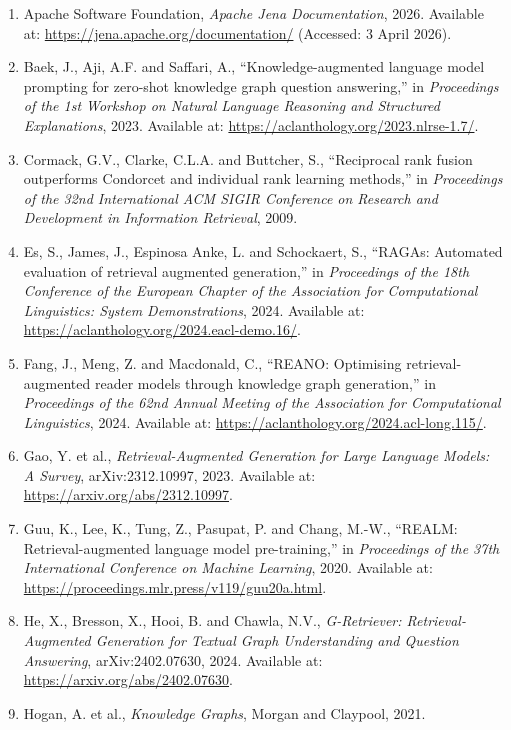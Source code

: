 \begin{enumerate}[leftmargin=*, label=\arabic*., itemsep=0.35\baselineskip]
\item Apache Software Foundation, \emph{Apache Jena Documentation}, 2026. Available at: \url{https://jena.apache.org/documentation/} (Accessed: 3 April 2026).
\item Baek, J., Aji, A.F. and Saffari, A., ``Knowledge-augmented language model prompting for zero-shot knowledge graph question answering,'' in \emph{Proceedings of the 1st Workshop on Natural Language Reasoning and Structured Explanations}, 2023. Available at: \url{https://aclanthology.org/2023.nlrse-1.7/}.
\item Cormack, G.V., Clarke, C.L.A. and Buttcher, S., ``Reciprocal rank fusion outperforms Condorcet and individual rank learning methods,'' in \emph{Proceedings of the 32nd International ACM SIGIR Conference on Research and Development in Information Retrieval}, 2009.
\item Es, S., James, J., Espinosa Anke, L. and Schockaert, S., ``RAGAs: Automated evaluation of retrieval augmented generation,'' in \emph{Proceedings of the 18th Conference of the European Chapter of the Association for Computational Linguistics: System Demonstrations}, 2024. Available at: \url{https://aclanthology.org/2024.eacl-demo.16/}.
\item Fang, J., Meng, Z. and Macdonald, C., ``REANO: Optimising retrieval-augmented reader models through knowledge graph generation,'' in \emph{Proceedings of the 62nd Annual Meeting of the Association for Computational Linguistics}, 2024. Available at: \url{https://aclanthology.org/2024.acl-long.115/}.
\item Gao, Y. et al., \emph{Retrieval-Augmented Generation for Large Language Models: A Survey}, arXiv:2312.10997, 2023. Available at: \url{https://arxiv.org/abs/2312.10997}.
\item Guu, K., Lee, K., Tung, Z., Pasupat, P. and Chang, M.-W., ``REALM: Retrieval-augmented language model pre-training,'' in \emph{Proceedings of the 37th International Conference on Machine Learning}, 2020. Available at: \url{https://proceedings.mlr.press/v119/guu20a.html}.
\item He, X., Bresson, X., Hooi, B. and Chawla, N.V., \emph{G-Retriever: Retrieval-Augmented Generation for Textual Graph Understanding and Question Answering}, arXiv:2402.07630, 2024. Available at: \url{https://arxiv.org/abs/2402.07630}.
\item Hogan, A. et al., \emph{Knowledge Graphs}, Morgan and Claypool, 2021.

\end{enumerate}
